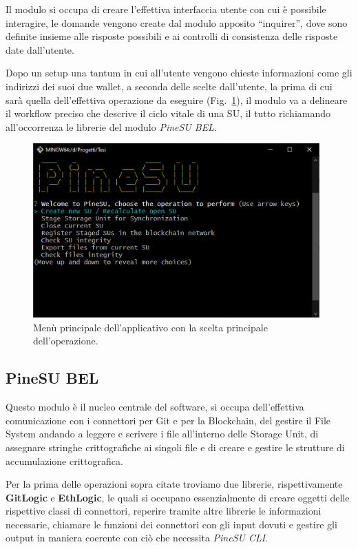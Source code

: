 Il modulo si occupa di creare l’effettiva interfaccia utente con cui è possibile interagire,
le domande vengono create dal modulo apposito “inquirer”, dove sono definite
insieme alle risposte possibili e ai controlli di consistenza delle risposte date dall’utente.

Dopo un setup una tantum in cui all’utente vengono chieste informazioni come gli indirizzi dei
suoi due wallet, a seconda delle scelte dall’utente, la prima di cui sarà quella dell’effettiva
operazione da eseguire (Fig.~\ref{fi:menu}), il modulo va a delineare il workflow preciso che descrive il ciclo vitale
di una SU, il tutto richiamando all’occorrenza le librerie del modulo \emph{PineSU BEL}. 

\begin{figure}[H]
    \centering
    \includegraphics[width=0.98\textwidth]{Figures/menu}
    \caption{\small{
    Menù principale dell'applicativo con la scelta principale dell'operazione.
    } %
    } %
    \label{fi:menu}
\end{figure}

\subsection{PineSU BEL}

Questo modulo è il nucleo centrale del software, si occupa dell’effettiva comunicazione con i connettori per Git e per la Blockchain, del gestire il File System andando a leggere e scrivere i file all’interno delle Storage Unit, di assegnare stringhe crittografiche ai singoli file e di creare e gestire le strutture di accumulazione crittografica.

Per la prima delle operazioni sopra citate troviamo due librerie, rispettivamente \textbf{GitLogic} e \textbf{EthLogic}, le quali si occupano essenzialmente di creare oggetti delle rispettive classi di connettori, reperire tramite altre librerie le informazioni necessarie, chiamare le funzioni dei connettori con gli input dovuti e gestire gli output in maniera coerente con ciò che necessita \emph{PineSU CLI}.


